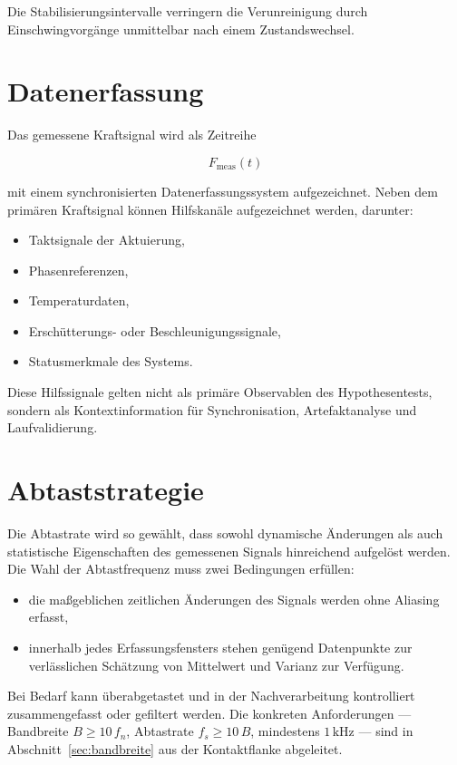 \documentclass[12pt,a4paper]{report}
\begin{document}
Die Stabilisierungsintervalle verringern die Verunreinigung durch
Einschwingvorgänge unmittelbar nach einem Zustandswechsel.

\section{Datenerfassung}

Das gemessene Kraftsignal wird als Zeitreihe

\begin{equation}
F_{\text{meas}}(t)
\end{equation}

mit einem synchronisierten Datenerfassungssystem aufgezeichnet. Neben dem
primären Kraftsignal können Hilfskanäle aufgezeichnet werden, darunter:

\begin{itemize}
\item Taktsignale der Aktuierung,
\item Phasenreferenzen,
\item Temperaturdaten,
\item Erschütterungs- oder Beschleunigungssignale,
\item Statusmerkmale des Systems.
\end{itemize}

Diese Hilfssignale gelten nicht als primäre Observablen des
Hypothesentests, sondern als Kontextinformation für Synchronisation,
Artefaktanalyse und Laufvalidierung.

\section{Abtaststrategie}
\label{sec:abtaststrategie}

Die Abtastrate wird so gewählt, dass sowohl dynamische Änderungen als
auch statistische Eigenschaften des gemessenen Signals hinreichend
aufgelöst werden. Die Wahl der Abtastfrequenz muss zwei Bedingungen
erfüllen:

\begin{itemize}
\item die maßgeblichen zeitlichen Änderungen des Signals werden ohne
      Aliasing erfasst,
\item innerhalb jedes Erfassungsfensters stehen genügend Datenpunkte zur
      verlässlichen Schätzung von Mittelwert und Varianz zur Verfügung.
\end{itemize}

Bei Bedarf kann überabgetastet und in der Nachverarbeitung kontrolliert
zusammengefasst oder gefiltert werden. Die konkreten Anforderungen ---
Bandbreite $B \geq 10\,f_n$, Abtastrate $f_s \geq 10\,B$, mindestens
$1\,\mathrm{kHz}$ --- sind in Abschnitt~\ref{sec:bandbreite} aus der
Kontaktflanke abgeleitet.
\end{document}
